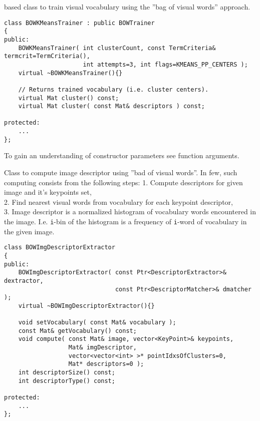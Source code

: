 

\begin{description}
\end{description}

 based class to train visual vocabulary using the ''bag of visual words'' approach.

\begin{lstlisting}
class BOWKMeansTrainer : public BOWTrainer
{
public:
    BOWKMeansTrainer( int clusterCount, const TermCriteria& termcrit=TermCriteria(),
                      int attempts=3, int flags=KMEANS_PP_CENTERS );
    virtual ~BOWKMeansTrainer(){}

    // Returns trained vocabulary (i.e. cluster centers).
    virtual Mat cluster() const;
    virtual Mat cluster( const Mat& descriptors ) const;

protected:
    ...
};
\end{lstlisting}
To gain an understanding of constructor parameters see  function 
arguments.


 Class to compute image descriptor using ''bad of visual words''. In few, 
 such computing consists from the following steps: 
 1. Compute descriptors for given image and it's keypoints set, \\
 2. Find nearest visual words from vocabulary for each keypoint descriptor, \\
 3. Image descriptor is a normalized histogram of vocabulary words encountered in the image. I.e. 
 \texttt{i}-bin of the histogram is a frequency of \texttt{i}-word of vocabulary in the given image.

\begin{lstlisting}
class BOWImgDescriptorExtractor
{
public:
    BOWImgDescriptorExtractor( const Ptr<DescriptorExtractor>& dextractor,
                               const Ptr<DescriptorMatcher>& dmatcher );
    virtual ~BOWImgDescriptorExtractor(){}

    void setVocabulary( const Mat& vocabulary );
    const Mat& getVocabulary() const;
    void compute( const Mat& image, vector<KeyPoint>& keypoints, 
                  Mat& imgDescriptor, 
                  vector<vector<int> >* pointIdxsOfClusters=0, 
                  Mat* descriptors=0 );
    int descriptorSize() const;
    int descriptorType() const;

protected:
    ...
};
\end{lstlisting}


